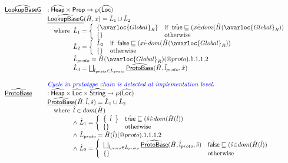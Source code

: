 \[\begin{array}{ll}
\ahf{LookupBaseG} & : \aHeap \times \SF{Prop} \rightarrow \powerset{\aLoc}\\
&
  \ahf{LookupBaseG}(\hat{H},x)
   = \hat{L}_1\cup\hat{L}_2\\
& \quad\wherec{
  \hat{L}_1 = \left\{
    \begin{array}{ll}
      \{\avarloc{Global}_R\}
      & \ifc{\atrue\sqsubseteq(x \dot{\in} dom(\hat{H}(\avarloc{Global}_R))} \\
      \{\}
      & \owc \\
    \end{array}\right. \\
  \hat{L}_2 = \left\{
    \begin{array}{ll}
      \hat{L}_3
      & \ifc{\vfalse\sqsubseteq(x \dot{\in} dom(\hat{H}(\avarloc{Global}_R))}\\
      \{\}
      & \owc \\
    \end{array}\right. \\
  \hat{L}_{proto} = \hat{H}(\avarloc{Global}_R)(\varprop{proto}).1.1.1.2\\
  \hat{L}_3 = 
    \bigsqcup_{\hat{l}_{proto}\in\hat{L}_{proto}}
    \ahf{ProtoBase}(\hat{H}, \hat{l}_{proto}, \hat{x})\\
}\\
\\


& {\inblue \textit{Cycle in prototype chain is detected at implementation level.}} \\
\ahf{ProtoBase} & : \aHeap \times \aLoc \times \abs{String} \rightarrow \powerset{\aLoc}\\
  & \ahf{ProtoBase}(\hat{H},\hat{l},\hat{s})
    = \hat{L}_1\cup\hat{L}_2\\
  & \quad\wherec{
      \hat{l} \in dom(\hat{H})\\
      \land\ \hat{L}_1 =
        \left\{
          \begin{array}{ll}
            \set{\hat{l}} & \atrue\sqsubseteq(\hat{s} \dot{\in} dom(\hat{H}(\hat{l}))\\
            \set{} & \owc \\
          \end{array}
        \right.\\
        \land\ \hat{L}_{proto} = \hat{H}(\hat{l})(\varprop{proto}).1.1.1.2\\
      \land\ \hat{L}_2 =
        \left\{
          \begin{array}{ll}
            \bigsqcup_{\hat{l}_{proto}\in\hat{L}_{proto}}\ahf{ProtoBase}(\hat{H},\hat{l}_{proto},\hat{s})
            & \afalse\sqsubseteq(\hat{s} \dot{\in} dom(\hat{H}(\hat{l}))\\
            \set{} & \owc \\
          \end{array}
        \right.\\
        
}
\end{array}\]
